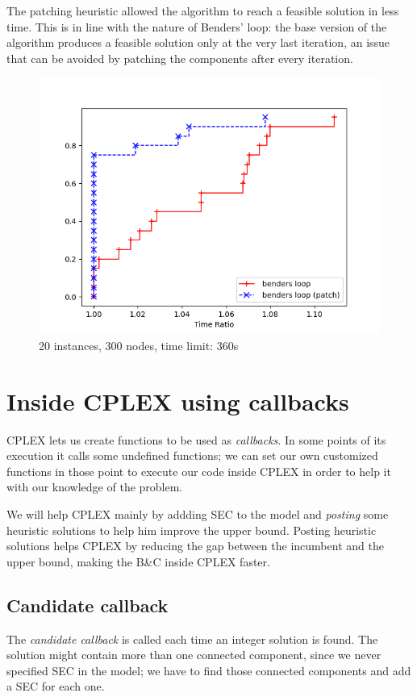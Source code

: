 The patching heuristic allowed the algorithm to reach a feasible solution in less time. This is in line with the nature of Benders' loop: the base version of the algorithm produces a feasible solution only at the very last iteration, an issue that can be avoided by patching the components after every iteration.

\FloatBarrier
\begin{figure}[h]
    \centering
    \includegraphics*[width=.6\textwidth]{../plots/perfprof_benders_times.png}
    \caption*{20 instances, 300 nodes, time limit: 360s}
\end{figure}
\FloatBarrier

\section{Inside CPLEX using callbacks}

CPLEX lets us create functions to be used as \textit{callbacks}. In some points of its execution it calls some undefined functions; we can set our own customized functions in those point to execute our code inside CPLEX in order to help it with our knowledge of the problem.

We will help CPLEX mainly by addding SEC to the model and \textit{posting} some heuristic solutions to help him improve the upper bound. Posting heuristic solutions helps CPLEX by reducing the gap between the incumbent and the upper bound, making the B\&C inside CPLEX faster.

\subsection{Candidate callback}
The \textit{candidate callback} is called each time an integer solution is found. The solution might contain more than one connected component, since we never specified SEC in the model; we have to find those connected components and add a SEC for each one.

